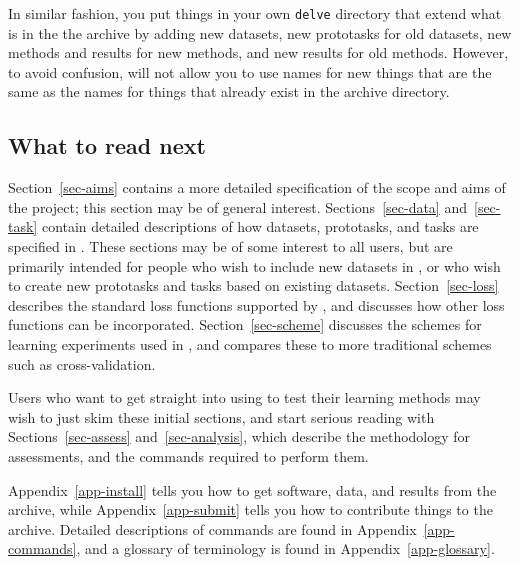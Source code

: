 In similar fashion, you put things in your own \texttt{delve}
directory that extend what is in the the \delve{} archive by adding
new datasets, new prototasks for old datasets, new methods and results
for new methods, and new results for old methods.  However, to avoid
confusion, \delve{} will not allow you to use names for new things
that are the same as the names for things that already exist in the
\delve{} archive directory.


\subsection{What to read next}\label{intro-what-next}

Section~\ref{sec-aims} contains a more detailed specification of the
scope and aims of the \delve{} project; this section may be of general
interest.  Sections~\ref{sec-data} and~\ref{sec-task} contain detailed
descriptions of how datasets, prototasks, and tasks are specified in
\delve{}. These sections may be of some interest to all users, but are
primarily intended for people who wish to include new datasets in
\delve{}, or who wish to create new prototasks and tasks based on
existing datasets.  Section~\ref{sec-loss} describes the standard loss
functions supported by \delve, and discusses how other loss functions
can be incorporated.  Section~\ref{sec-scheme} discusses the schemes
for learning experiments used in \delve{}, and compares these to more
traditional schemes such as cross-validation.  

Users who want to get straight into using \delve{} to test their
learning methods may wish to just skim these initial sections, and
start serious reading with Sections~\ref{sec-assess}
and~\ref{sec-analysis}, which describe the methodology for \delve{}
assessments, and the \delve{} commands required to perform them.

Appendix~\ref{app-install} tells you how to get software, data,
and results from the \delve{} archive, while Appendix~\ref{app-submit}
tells you how to contribute things to the \delve{} archive.  Detailed
descriptions of \delve{} commands are found in
Appendix~\ref{app-commands}, and a glossary of \delve{} terminology is
found in Appendix~\ref{app-glossary}.
